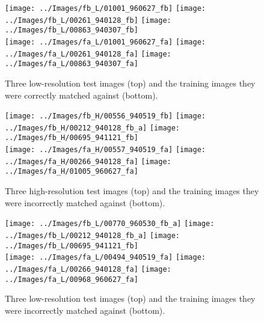 \documentclass[headings=optiontoheadandtoc,listof=totoc,parskip=full]{scrartcl}
\begin{document}
\begin{figure}[H]
	\centering
	\texttt{[image: ../Images/fb\_L/01001\_960627\_fb]}
	\texttt{[image: ../Images/fb\_L/00261\_940128\_fb]}
	\texttt{[image: ../Images/fb\_L/00863\_940307\_fb]}\\
	\texttt{[image: ../Images/fa\_L/01001\_960627\_fa]}
	\texttt{[image: ../Images/fa\_L/00261\_940128\_fa]}
	\texttt{[image: ../Images/fa\_L/00863\_940307\_fa]}
	\caption{Three low-resolution test images (top) and the training images they were correctly matched against (bottom).}
\end{figure}

\begin{figure}[H]
	\centering
	\texttt{[image: ../Images/fb\_H/00556\_940519\_fb]}
	\texttt{[image: ../Images/fb\_H/00212\_940128\_fb\_a]}
	\texttt{[image: ../Images/fb\_H/00695\_941121\_fb]}\\
	\texttt{[image: ../Images/fa\_H/00557\_940519\_fa]}
	\texttt{[image: ../Images/fa\_H/00266\_940128\_fa]}
	\texttt{[image: ../Images/fa\_H/01005\_960627\_fa]}
	\caption{Three high-resolution test images (top) and the training images they were incorrectly matched against (bottom).}
\end{figure}

\begin{figure}[H]
	\centering
	\texttt{[image: ../Images/fb\_L/00770\_960530\_fb\_a]}
	\texttt{[image: ../Images/fb\_L/00212\_940128\_fb\_a]}
	\texttt{[image: ../Images/fb\_L/00695\_941121\_fb]}\\
	\texttt{[image: ../Images/fa\_L/00494\_940519\_fa]}
	\texttt{[image: ../Images/fa\_L/00266\_940128\_fa]}
	\texttt{[image: ../Images/fa\_L/00968\_960627\_fa]}
	\caption{Three low-resolution test images (top) and the training images they were incorrectly matched against (bottom).}
\end{figure}
\end{document}
